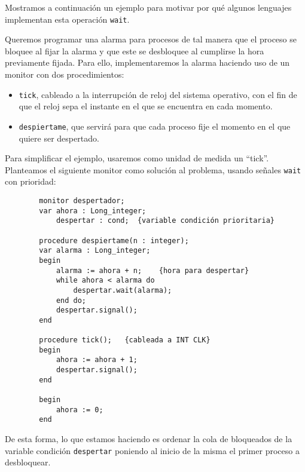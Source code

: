 Mostramos a continuación un ejemplo para motivar por qué algunos lenguajes implementan esta operación \verb|wait|.
\begin{ejemplo}
    Queremos programar una alarma para procesos de tal manera que el proceso se bloquee al fijar la alarma y que este se desbloquee al cumplirse la hora previamente fijada. Para ello, implementaremos la alarma haciendo uso de un monitor con dos procedimientos:
    \begin{itemize}
        \item \verb|tick|, cableado a la interrupción de reloj del sistema operativo, con el fin de que el reloj sepa el instante en el que se encuentra en cada momento.
        \item \verb|despiertame|, que servirá para que cada proceso fije el momento en el que quiere ser despertado.
    \end{itemize}
    Para simplificar el ejemplo, usaremos como unidad de medida un ``tick''. Planteamos el siguiente monitor como solución al problema, usando señales \verb|wait| con prioridad:
    \begin{verbatim}
        monitor despertador;
        var ahora : Long_integer;
            despertar : cond;  {variable condición prioritaria}

        procedure despiertame(n : integer);
        var alarma : Long_integer;
        begin
            alarma := ahora + n;    {hora para despertar}
            while ahora < alarma do 
                despertar.wait(alarma);
            end do;
            despertar.signal();
        end

        procedure tick();   {cableada a INT CLK}
        begin
            ahora := ahora + 1;
            despertar.signal();
        end

        begin
            ahora := 0;
        end
    \end{verbatim}
    De esta forma, lo que estamos haciendo es ordenar la cola de bloqueados de la variable condición \verb|despertar| poniendo al inicio de la misma el primer proceso a desbloquear.


\end{ejemplo}
